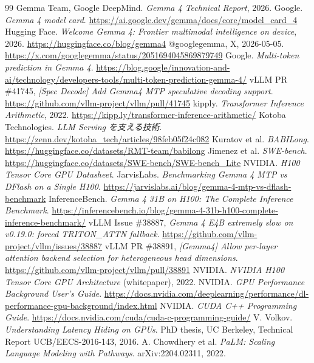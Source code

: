 \documentclass[a4paper,10pt]{ltjsarticle}
\begin{document}


\begin{thebibliography}{99}
 Gemma Team, Google DeepMind. \textit{Gemma 4 Technical Report}, 2026.
 Google. \textit{Gemma 4 model card}. \url{https://ai.google.dev/gemma/docs/core/model_card_4}
 Hugging Face. \textit{Welcome Gemma 4: Frontier multimodal intelligence on device}, 2026. \url{https://huggingface.co/blog/gemma4}
 @googlegemma, X, 2026-05-05. \url{https://x.com/googlegemma/status/2051694045869879749}
 Google. \textit{Multi-token prediction in Gemma 4}. \url{https://blog.google/innovation-and-ai/technology/developers-tools/multi-token-prediction-gemma-4/}
 vLLM PR \#41745, \textit{[Spec Decode] Add Gemma4 MTP speculative decoding support}. \url{https://github.com/vllm-project/vllm/pull/41745}
 kipply. \textit{Transformer Inference Arithmetic}, 2022. \url{https://kipp.ly/transformer-inference-arithmetic/}
 Kotoba Technologies. \textit{LLM Serving を支える技術}. \url{https://zenn.dev/kotoba_tech/articles/98feb05f24c082}
 Kuratov et al. \textit{BABILong}. \url{https://huggingface.co/datasets/RMT-team/babilong}
 Jimenez et al. \textit{SWE-bench}. \url{https://huggingface.co/datasets/SWE-bench/SWE-bench_Lite}
 NVIDIA. \textit{H100 Tensor Core GPU Datasheet}.
 JarvisLabs. \textit{Benchmarking Gemma 4 MTP vs DFlash on a Single H100}. \url{https://jarvislabs.ai/blog/gemma-4-mtp-vs-dflash-benchmark}
 InferenceBench. \textit{Gemma 4 31B on H100: The Complete Inference Benchmark}. \url{https://inferencebench.io/blog/gemma-4-31b-h100-complete-inference-benchmark/}
 vLLM Issue \#38887, \textit{Gemma 4 E4B extremely slow on v0.19.0: forced TRITON\_ATTN fallback}. \url{https://github.com/vllm-project/vllm/issues/38887}
 vLLM PR \#38891, \textit{[Gemma4] Allow per-layer attention backend selection for heterogeneous head dimensions}. \url{https://github.com/vllm-project/vllm/pull/38891}
 NVIDIA. \textit{NVIDIA H100 Tensor Core GPU Architecture} (whitepaper), 2022.
 NVIDIA. \textit{GPU Performance Background User's Guide}. \url{https://docs.nvidia.com/deeplearning/performance/dl-performance-gpu-background/index.html}
 NVIDIA. \textit{CUDA C++ Programming Guide}. \url{https://docs.nvidia.com/cuda/cuda-c-programming-guide/}
 V. Volkov. \textit{Understanding Latency Hiding on GPUs}. PhD thesis, UC Berkeley, Technical Report UCB/EECS-2016-143, 2016.
 A. Chowdhery et al. \textit{PaLM: Scaling Language Modeling with Pathways}. arXiv:2204.02311, 2022.
\end{thebibliography}
\end{document}
